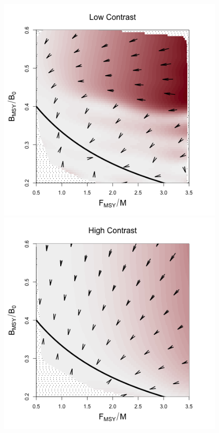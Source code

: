 \documentclass[12pt]{article}
\begin{document}
\begin{figure}[h!]
\begin{minipage}[h!]{0.44\textwidth}
\includegraphics[width=\textwidth]{../gpBias/directionalBiasSchnuteSubHHardFlatT30N150WWideN112.png}
\end{minipage}
\begin{minipage}[h!]{0.44\textwidth}
\includegraphics[width=\textwidth]{../gpBias/directionalBiasSchnuteSubExpT45N150Wide.png}

\end{minipage}
\end{figure}
\end{document}
